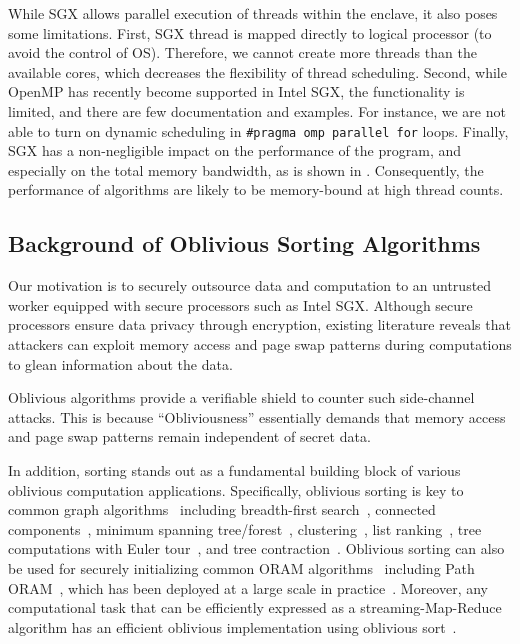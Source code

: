 \documentclass{article}
\begin{document}
While SGX allows parallel execution of threads within the enclave, it also poses some limitations. First, SGX thread is mapped directly to logical processor (to avoid the control of OS). Therefore, we cannot create more threads than the available cores, which decreases the flexibility of thread scheduling. Second, while OpenMP has recently become supported in Intel SGX, the functionality is limited, and there are few documentation and examples. For instance, we are not able to turn on dynamic scheduling in {\tt \#pragma omp parallel for} loops. Finally, SGX has a non-negligible impact on the performance of the program, and especially on the total memory bandwidth, as is shown in \cite{sgxv2benchmark, portorshim}. Consequently, the performance of algorithms are likely to be memory-bound at high thread counts.

\subsection{Background of Oblivious Sorting Algorithms}
Our motivation is to securely outsource data and computation to an untrusted worker equipped with secure processors such as Intel SGX. Although secure processors ensure data privacy through encryption, existing literature reveals that attackers can exploit memory access and page swap patterns during computations to glean information about the data.

Oblivious algorithms provide a verifiable shield to counter such side-channel attacks. This is because ``Obliviousness'' essentially demands that memory access and page swap patterns remain independent of secret data. 

In addition, sorting stands out as a fundamental building block of various oblivious computation applications. Specifically, oblivious sorting is
key to common
graph algorithms~\cite{oblivm,blantongraph,oram09} including
breadth-first search~\cite{oram09,blantongraph},
connected components~\cite{domulticore},
minimum spanning tree/forest~\cite{domulticore},
clustering~\cite{oblivm},
list ranking~\cite{domulticore}, tree computations with Euler tour~\cite{domulticore},
and tree contraction~\cite{domulticore}.
Oblivious sorting can also be used for securely initializing
common ORAM algorithms~\cite{enigmap} including
Path ORAM~\cite{pathoramjrnl}, which has been deployed at a large scale
in practice~\cite{signalpathoram}.
Moreover, any computational task
that can be efficiently expressed as a streaming-Map-Reduce algorithm
has an efficient
oblivious implementation using oblivious sort~\cite{oram09,oblivm}.
\end{document}
